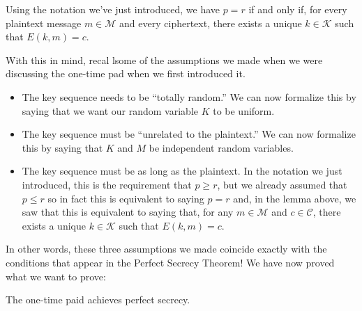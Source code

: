 \documentclass[letterpaper]{article}
\begin{document}
\begin{lemma}{}{}
    Using the notation we've just introduced, we have $p = r$ if and only if, for every plaintext message $m \in \mathscr{M}$ and every ciphertext, there exists a unique $k \in \mathscr{K}$ such that $E(k, m) = c$. 
\end{lemma}
With this in mind, recal lsome of the assumptions we made when we were discussing the one-time pad when we first introduced it. 
\begin{itemize}
    \item The key sequence needs to be ``totally random.'' We can now formalize this by saying that we want our random variable $K$ to be uniform. 
    \item The key sequence must be ``unrelated to the plaintext.'' We can now formalize this by saying that $K$ and $M$ be independent random variables. 
    \item The key sequence must be as long as the plaintext. In the notation we just introduced, this is the requirement that $p \geq r$, but we already assumed that $p \leq r$ so in fact this is equivalent to saying $p = r$ and, in the lemma above, we saw that this is equivalent to saying that, for any $m \in \mathscr{M}$ and $c \in \mathscr{C}$, there exists a unique $k \in \mathscr{K}$ such that $E(k, m) = c$. 
\end{itemize}
In other words, these three assumptions we made coincide exactly with the conditions that appear in the Perfect Secrecy Theorem! We have now proved what we want to prove:
\begin{corollary}{}{}
    The one-time paid achieves perfect secrecy.
\end{corollary}













\newpage 
\end{document}
